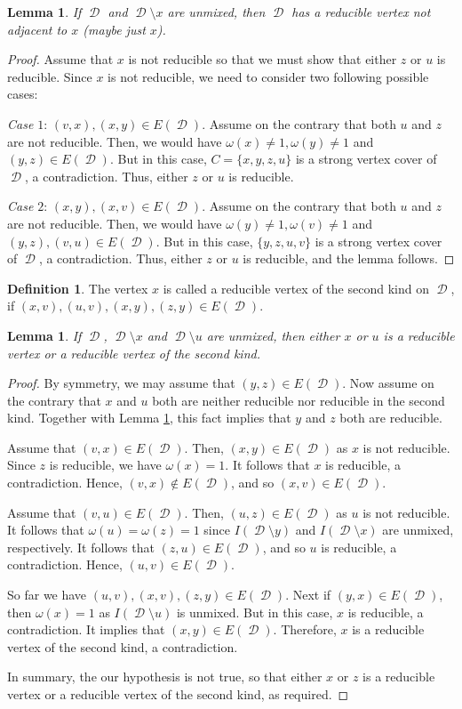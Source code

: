 \documentclass[12pt, amscd]{amsart}
\newtheorem{lem}[thm]{Lemma}
\theoremstyle{definition}
\newtheorem{defn}[thm]{Definition}
\DeclareMathOperator{\D}{\mathcal{D}}
\newcommand{\0}{\bold{0}}
\begin{document}
\begin{lem}\label{CM-BV1} If $\D$ and $\D\setminus x$ are unmixed, then
$\D$ has a reducible vertex not adjacent to $x$ (maybe just $x$). 
\end{lem}
\begin{proof} Assume that $x$ is not reducible so that we must show that either $z$ or $u$ is reducible. Since $x$ is not reducible, we need to consider two following possible cases:

\medskip

{\it Case $1$}: $(v,x), (x,y) \in E(\D)$. Assume on the contrary that both $u$ and $z$ are not reducible. Then, we would have $\omega(x)\ne 1, \omega(y)\ne 1$ and $(y,z)\in E(\D)$. But in this case, $C=\{x,y,z,u\}$ is a strong vertex cover of $\D$, a contradiction. Thus, either $z$ or $u$ is reducible.

\medskip

{\it Case $2$}: $(x,y), (x,v)\in E(\D)$. Assume on the contrary that both $u$ and $z$ are not reducible. Then, we would have $\omega(y)\ne 1, \omega(v)\ne 1$ and $(y,z), (v,u)\in E(\D)$. But in this case, $\{y,z,u,v\}$ is a strong vertex cover of $\D$, a contradiction. Thus, either $z$ or $u$ is reducible, and the lemma follows.
\end{proof}

\begin{defn} The vertex $x$ is called a reducible vertex of the second kind on $\D$, if $(x,v), (u,v), (x,y),(z,y)\in E(\D)$.
\end{defn}

\begin{lem}\label{CM-BV2} If $\D$, $\D\setminus x$ and $\D\setminus u$ are unmixed, then either $x$ or $u$ is a reducible vertex or a reducible vertex of the second kind.
\end{lem}
\begin{proof} By symmetry, we may assume that $(y,z)\in E(\D)$. Now assume on the contrary that $x$ and $u$ both are neither reducible nor reducible in the second kind. Together with Lemma \ref{CM-BV1}, this fact implies that $y$ and $z$ both are reducible.

Assume that $(v,x)\in E(\D)$. Then, $(x,y) \in E(\D)$ as $x$ is not reducible. Since $z$ is reducible, we have $\omega(x)=1$. It follows that $x$ is reducible, a contradiction. Hence, $(v,x)\notin E(\D)$, and so $(x,v)\in E(\D)$.


Assume that $(v,u)\in E(\D)$. Then, $(u,z) \in E(\D)$ as $u$ is not reducible. It follows that $\omega(u)=\omega(z)=1$ since $I(\D\setminus y)$ and $I(\D\setminus x)$ are unmixed, respectively. It follows that $(z,u)\in E(\D)$, and so $u$ is reducible, a contradiction. Hence, $(u,v)\in E(\D)$.

So far we have $(u,v), (x,v), (z,y)\in E(\D)$. Next if $(y,x)\in E(\D)$, then $\omega(x)=1$ as $I(\D\setminus u)$ is unmixed. But in this case, $x$ is reducible, a contradiction.  It implies that $(x,y)\in E(\D)$. Therefore, $x$ is a reducible vertex of the second kind, a contradiction.

In summary, the our hypothesis is not true, so that either $x$ or $z$ is a reducible vertex or a reducible vertex of the second kind, as required.
\end{proof}
\end{document}
